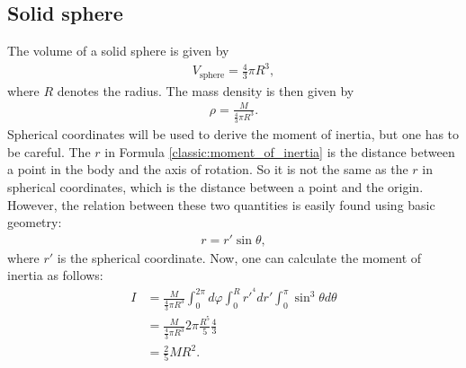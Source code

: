 \subsection{Solid sphere}

    The volume of a solid sphere is given by
    \begin{gather}
        V_\mathrm{sphere} = \frac{4}{3}\pi R^3,
    \end{gather}
    where $R$ denotes the radius. The mass density is then given by
    \begin{gather}
        \rho = \frac{M}{\frac{4}{3}\pi R^3}.
    \end{gather}
    Spherical coordinates will be used to derive the moment of inertia, but one has to be careful. The $r$ in Formula \ref{classic:moment_of_inertia} is the distance between a point in the body and the axis of rotation. So it is not the same as the $r$ in spherical coordinates, which is the distance between a point and the origin. However, the relation between these two quantities is easily found using basic geometry:
    \begin{gather}
        r = r'\sin\theta,
    \end{gather}
    where $r'$ is the spherical coordinate. Now, one can calculate the moment of inertia as follows:
    \begin{align}
        I &= \frac{M}{\frac{4}{3}\pi R^3} \int_0^{2\pi}d\varphi\int_0^Rr'^{^4}dr'\int_0^\pi\sin^3\theta d\theta\nonumber\\
        &= \frac{M}{\frac{4}{3}\pi R^3} 2\pi\frac{R^5}{5}\frac{4}{3}\nonumber\\
        &= \frac{2}{5}MR^2.
    \end{align}